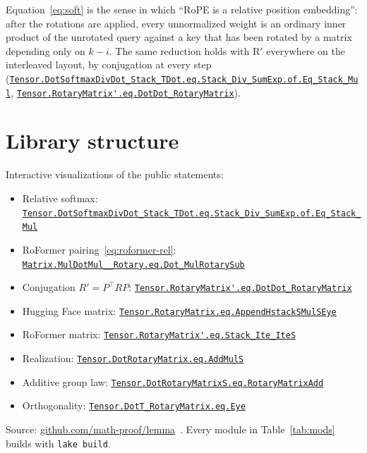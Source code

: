 \documentclass[11pt,a4paper]{article}
\newcommand{\lmod}[1]{\href{http://www.lemma.cn/lean/?module=#1}{\nolinkurl{#1}}}
\newcommand{\rot}{\mathrm{R}}
\begin{document}
Equation~\eqref{eq:soft} is the sense in which ``RoPE is a relative position embedding'': after the rotations are applied, every unnormalized weight is an ordinary inner product of the unrotated query against a key that has been rotated by a matrix depending only on $k-i$.
The same reduction holds with $\rot'$ everywhere on the interleaved layout, by conjugation at every step (\lmod{Tensor.DotSoftmaxDivDot_Stack_TDot.eq.Stack_Div_SumExp.of.Eq_Stack_Mul}, \lmod{Tensor.RotaryMatrix'.eq.DotDot_RotaryMatrix}).

\section{Library structure}
\label{sec:artifact}

Interactive visualizations of the public statements:
\begin{itemize}[noitemsep]
  \item Relative softmax:
    \lmod{Tensor.DotSoftmaxDivDot_Stack_TDot.eq.Stack_Div_SumExp.of.Eq_Stack_Mul}
  \item RoFormer pairing~\eqref{eq:roformer-rel}:
    \lmod{Matrix.MulDotMul__Rotary.eq.Dot_MulRotarySub}
  \item Conjugation \(R'=P^\top RP\):
    \lmod{Tensor.RotaryMatrix'.eq.DotDot_RotaryMatrix}
  \item Hugging Face matrix:
    \lmod{Tensor.RotaryMatrix.eq.AppendHstackSMulSEye}
  \item RoFormer matrix:
    \lmod{Tensor.RotaryMatrix'.eq.Stack_Ite_IteS}
  \item Realization:
    \lmod{Tensor.DotRotaryMatrix.eq.AddMulS}
  \item Additive group law:
    \lmod{Tensor.DotRotaryMatrixS.eq.RotaryMatrixAdd}
  \item Orthogonality:
    \lmod{Tensor.DotT_RotaryMatrix.eq.Eye}
\end{itemize}
Source: \href{https://github.com/math-proof/lemma}{github.com/math-proof/lemma}~\cite{lemma_repo}.
Every module in Table~\ref{tab:mods} builds with \texttt{lake build}.
\end{document}
